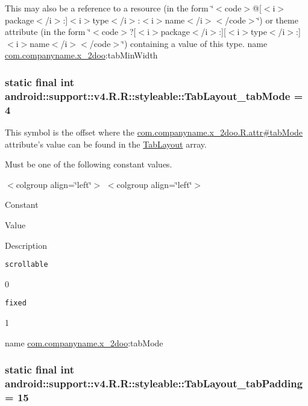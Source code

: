 This may also be a reference to a resource (in the form \char`\"{}$<$code$>$@\mbox{[}$<$i$>$package$<$/i$>$:\mbox{]}$<$i$>$type$<$/i$>$:$<$i$>$name$<$/i$>$$<$/code$>$\char`\"{}) or theme attribute (in the form \char`\"{}$<$code$>$?\mbox{[}$<$i$>$package$<$/i$>$:\mbox{]}\mbox{[}$<$i$>$type$<$/i$>$:\mbox{]}$<$i$>$name$<$/i$>$$<$/code$>$\char`\"{}) containing a value of this type.  name \hyperlink{namespacecom_1_1companyname_1_1x__2doo}{com.companyname.x\_\-2doo}:tabMinWidth \hypertarget{classandroid_1_1support_1_1v4_1_1_r_1_1styleable_87f917746f24bf8503296b15435b51c7}{
\subsubsection[{TabLayout\_\-tabMode}]{\setlength{\rightskip}{0pt plus 5cm}static final int android::support::v4.R.R::styleable::TabLayout\_\-tabMode = 4}}
\label{classandroid_1_1support_1_1v4_1_1_r_1_1styleable_87f917746f24bf8503296b15435b51c7}


This symbol is the offset where the \hyperlink{classcom_1_1companyname_1_1x__2doo_1_1_r_1_1attr_73f1c36a4a9de5b2fc10857f7dd1e233}{com.companyname.x\_\-2doo.R.attr\#tabMode} attribute's value can be found in the \hyperlink{classandroid_1_1support_1_1v4_1_1_r_1_1styleable_d1f1104cdc4fac0ab4797d48f7efe351}{TabLayout} array.

Must be one of the following constant values. \begin{TabularC}{0}
\hline
\end{TabularC}
$<$colgroup align=\char`\"{}left\char`\"{}$>$ $<$colgroup align=\char`\"{}left\char`\"{}$>$ 

Constant

Value

Description 

{\tt scrollable}

0

{\tt fixed}

1

name \hyperlink{namespacecom_1_1companyname_1_1x__2doo}{com.companyname.x\_\-2doo}:tabMode \hypertarget{classandroid_1_1support_1_1v4_1_1_r_1_1styleable_4298aad07907a00ae8fb09582886b5c7}{
\subsubsection[{TabLayout\_\-tabPadding}]{\setlength{\rightskip}{0pt plus 5cm}static final int android::support::v4.R.R::styleable::TabLayout\_\-tabPadding = 15}}
\label{classandroid_1_1support_1_1v4_1_1_r_1_1styleable_4298aad07907a00ae8fb09582886b5c7}


